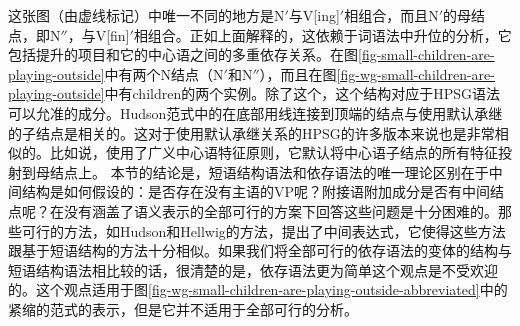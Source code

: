 这张图（由虚线标记）中唯一不同的地方是N$'$与V{[ing]}$'$相组合，而且N$'$的母结点，即N$''$，与V{[fin]}$'$相组合。正如上面解释的，这依赖于词语法中升位的分析，它包括提升的项目和它的中心语之间的多重依存关系。在图\ref{fig-small-children-are-playing-outside}中有两个N结点（N$'$和N$''$），而且在图\ref{fig-wg-small-children-are-playing-outside}中有children的两个实例。除了这个，这个结构对应于HPSG语法可以允准的成分。Hudson范式中的在底部用线连接到顶端的结点与使用默认承继的子结点是相关的。这对于使用默认承继关系的HPSG的许多版本来说也是非常相似的。比如说，\citet[]{GSag2000a-u}使用了广义中心语特征原则，它默认将中心语子结点的所有特征投射到母结点上。
%
本节的结论是，短语结构语法和依存语法的唯一理论区别在于中间结构是如何假设的：是否存在没有主语的VP呢？附接语附加成分是否有中间结点呢？在没有涵盖了语义表示的全部可行的方案下回答这些问题是十分困难的。那些可行的方法，如Hudson和Hellwig的方法，提出了中间表达式，它使得这些方法跟基于短语结构的方法十分相似。如果我们将全部可行的依存语法的变体的结构与短语结构语法相比较的话，很清楚的是，依存语法更为简单这个观点是不受欢迎的。这个观点适用于图\ref{fig-wg-small-children-are-playing-outside-abbreviated}中的紧缩的范式的表示，但是它并不适用于全部可行的分析。

